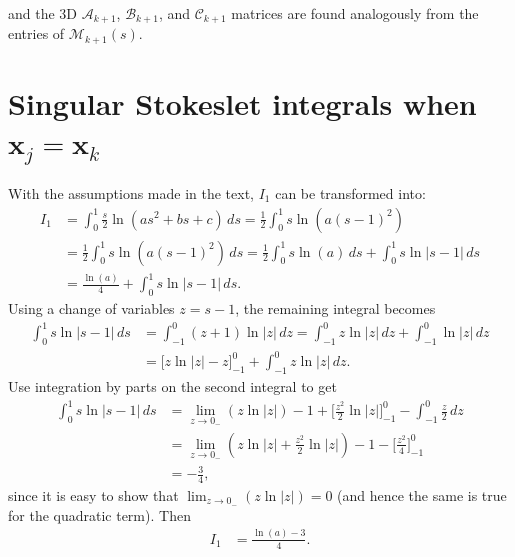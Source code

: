 \documentclass[12pt]{article}
\newcommand{\bx}{\mathbf{x}}
\newcommand{\baas}[1]{\begin{align*} #1 \end{align*}}
\begin{document}
and the 3D $\mathcal{A}_{k+1}$, $\mathcal{B}_{k+1}$, and $\mathcal{C}_{k+1}$ matrices are found analogously from the entries of $\mathcal{M}_{k+1}(s)$. 

\section{Singular Stokeslet integrals when $\bx_j = \bx_k$}\label{singularints}
With the assumptions made in the text, $I_1$ can be transformed into:
\baas{
I_1 & = \int_0^1 \frac{s}{2}\ln \left( as^2 + bs + c \right) \, ds = \frac{1}{2}\int_0^1 s \ln\left( a(s-1)^2 \right) \\
&= \frac{1}{2}\int_0^1 s \ln\left( a(s-1)^2 \right)\, ds = \frac{1}{2}\int_0^1 s\ln(a)\, ds + \int_0^1 s \ln| s-1 | \, ds \\
&= \frac{\ln(a)}{4} + \int_0^1 s \ln| s-1 | \, ds.
}
Using a change of variables $z = s-1$, the remaining integral becomes
\baas{
\int_0^1 s \ln| s-1 | \, ds & = \int_{-1}^0 (z+1) \ln |z| \, dz = \int_{-1}^0 z\ln |z| \, dz + \int_{-1}^0 \ln |z| \, dz \\ 
&= \Bigg[ z \ln |z| - z \Bigg]_{-1}^0 + \int_{-1}^0 z\ln |z| \, dz.
}	
Use integration by parts on the second integral to get
\baas{
\int_0^1 s \ln| s-1 | \, ds & = \lim_{z \to 0_-} (z \ln |z|) - 1 + \Bigg[ \frac{z^2}{2} \ln |z| \Bigg]_{-1}^0 - \int_{-1}^0 \frac{z}{2} \, dz \\ 
&= \lim_{z \to 0_-} (z \ln |z| + \frac{z^2}{2} \ln |z|) - 1 - \Bigg[ \frac{z^2}{4} \Bigg]_{-1}^0 \\
&= -\frac{3}{4},
}	
since it is easy to show that $\lim_{z \to 0_-} (z \ln |z|) = 0$ (and hence the same is true for the quadratic term). Then 
\baas{
I_1 & = \frac{\ln(a) - 3}{4}.
}
\end{document}
